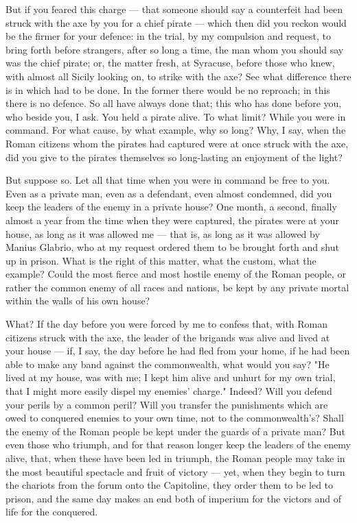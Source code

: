  But if you feared this charge --- that someone should say a counterfeit had been struck with the axe by you for a chief pirate --- which then did you reckon would be the firmer for your defence: in the trial, by my compulsion and request, to bring forth before strangers, after so long a time, the man whom you should say was the chief pirate; or, the matter fresh, at Syracuse, before those who knew, with almost all Sicily looking on, to strike with the axe? See what difference there is in which had to be done. In the former there would be no reproach; in this there is no defence. So all have always done that; this who has done before you, who beside you, I ask. You held a pirate alive. To what limit? While you were in command. For what cause, by what example, why so long? Why, I say, when the Roman citizens whom the pirates had captured were at once struck with the axe, did you give to the pirates themselves so long-lasting an enjoyment of the light?

 But suppose so. Let all that time when you were in command be free to you. Even as a private man, even as a defendant, even almost condemned, did you keep the leaders of the enemy in a private house? One month, a second, finally almost a year from the time when they were captured, the pirates were at your house, as long as it was allowed me --- that is, as long as it was allowed by Manius Glabrio, who at my request ordered them to be brought forth and shut up in prison. What is the right of this matter, what the custom, what the example? Could the most fierce and most hostile enemy of the Roman people, or rather the common enemy of all races and nations, be kept by any private mortal within the walls of his own house?

 What? If the day before you were forced by me to confess that, with Roman citizens struck with the axe, the leader of the brigands was alive and lived at your house --- if, I say, the day before he had fled from your home, if he had been able to make any band against the commonwealth, what would you say? "He lived at my house, was with me; I kept him alive and unhurt for my own trial, that I might more easily dispel my enemies' charge." Indeed? Will you defend your perils by a common peril? Will you transfer the punishments which are owed to conquered enemies to your own time, not to the commonwealth's? Shall the enemy of the Roman people be kept under the guards of a private man? But even those who triumph, and for that reason longer keep the leaders of the enemy alive, that, when these have been led in triumph, the Roman people may take in the most beautiful spectacle and fruit of victory --- yet, when they begin to turn the chariots from the forum onto the Capitoline, they order them to be led to prison, and the same day makes an end both of imperium for the victors and of life for the conquered.

